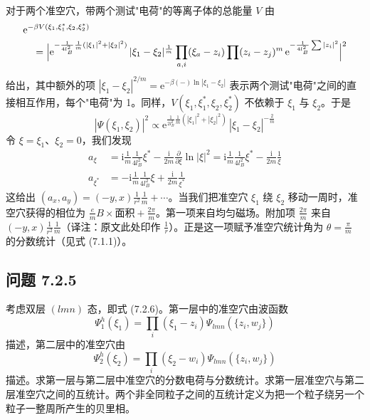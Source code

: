 对于两个准空穴，带两个测试"电荷"的等离子体的总能量 $V$ 由
\begin{align*}
&\mathrm{e}^{-\beta V(\xi_1,\xi_1^*,\xi_2,\xi_2^*)}\\
&\quad=\Bigl|\mathrm{e}^{-\frac{1}{4l_B^2}\frac{1}{m}(|\xi_1|^2+|\xi_2|^2)}\,|\xi_1-\xi_2|^{\frac{1}{m}}\prod_{a,i}(\xi_a-z_i)\prod(z_i-z_j)^m\,\mathrm{e}^{-\frac{1}{4l_B^2}\sum|z_i|^2}\Bigr|^2
\end{align*}
给出，其中额外的项 $|\xi_1-\xi_2|^{2/m}=\mathrm{e}^{-\beta(-)\ln|\xi_1-\xi_2|}$ 表示两个测试"电荷"之间的直接相互作用，每个"电荷"为 1。同样，$V(\xi_1,\xi_1^*,\xi_2,\xi_2^*)$ 不依赖于 $\xi_1$ 与 $\xi_2$。于是
\begin{equation*}
|\Psi(\xi_1,\xi_2)|^2\propto\mathrm{e}^{\frac{1}{2l_B^2}\frac{1}{m}(|\xi_1|^2+|\xi_2|^2)}\,|\xi_1-\xi_2|^{-\frac{2}{m}}
\end{equation*}
令 $\xi=\xi_1$、$\xi_2=0$，我们发现
\begin{align*}
a_\xi&=\mathrm{i}\frac{1}{m}\frac{1}{4l_B^2}\xi^*-\frac{\mathrm{i}}{2m}\frac{\partial}{\partial\xi}\ln|\xi|^2=\mathrm{i}\frac{1}{m}\frac{1}{4l_B^2}\xi^*-\frac{\mathrm{i}}{2m}\frac{1}{\xi}\\
a_{\xi^*}&=-\mathrm{i}\frac{1}{m}\frac{1}{4l_B^2}\xi+\frac{\mathrm{i}}{2m}\frac{1}{\xi^*}
\end{align*}
这给出 $(a_x,a_y)=(-y,x)\frac{1}{r^2}\frac{1}{m}+\cdots$。当我们把准空穴 $\xi_1$ 绕 $\xi_2$ 移动一周时，准空穴获得的相位为 $\frac{e}{m}B\times\text{面积}+\frac{2\pi}{m}$。第一项来自均匀磁场。附加项 $\frac{2\pi}{m}$ 来自 $(-y,x)\frac{1}{r^2}\frac{1}{m}$（译注：原文此处印作 $\frac{1}{r}$）。正是这一项赋予准空穴统计角为 $\theta=\frac{\pi}{m}$ 的分数统计（见式 (7.1.1)）。

\subsection*{问题 7.2.5}

考虑双层 $(lmn)$ 态，即式 (7.2.6)。第一层中的准空穴由波函数
\begin{equation*}
\Psi^h_1(\xi_1)=\prod_i(\xi_1-z_i)\Psi_{lmn}(\{z_i,w_j\})
\end{equation*}
描述，第二层中的准空穴由
\begin{equation*}
\Psi^h_2(\xi_2)=\prod_i(\xi_2-w_i)\Psi_{lmn}(\{z_i,w_j\})
\end{equation*}
描述。求第一层与第二层中准空穴的分数电荷与分数统计。求第一层准空穴与第二层准空穴之间的互统计。两个非全同粒子之间的互统计定义为把一个粒子绕另一个粒子一整周所产生的贝里相。

